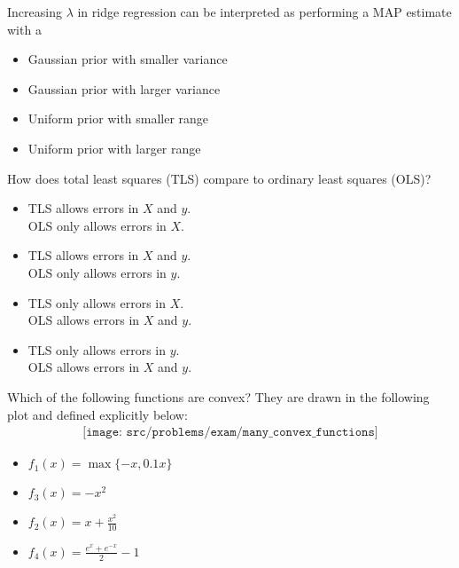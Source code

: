 \begin{Parts}

\Part Increasing $\lambda$ in ridge regression can be interpreted as performing a MAP estimate with a
\begin{multicols}{2}
	\begin{itemize}[label= ,itemsep=10pt, topsep=10pt, leftmargin=0pt]
		\item \mcqb Gaussian prior with smaller variance
		\item \mcqb Gaussian prior with larger variance
		\item \mcqb Uniform prior with smaller range
		\item \mcqb Uniform prior with larger range
	\end{itemize}
\end{multicols}

\Part How does total least squares (TLS) compare to ordinary least squares (OLS)?
\begin{multicols}{2}
	\begin{itemize}[label= ,itemsep=10pt, topsep=10pt, leftmargin=0pt]
		\item \mcqb TLS allows errors in $X$ and $y$. \\ OLS only allows errors in $X$.
		\item \mcqb TLS allows errors in $X$ and $y$. \\ OLS only allows errors in $y$. 
		\item \mcqb TLS only allows errors in $X$. \\ OLS allows errors in $X$ and $y$. 
		\item \mcqb TLS only allows errors in $y$. \\ OLS allows errors in $X$ and $y$. 
	\end{itemize}
\end{multicols}

\Part Which of the following functions are convex? They are drawn in the following plot and defined explicitly below:
\begin{align*}
\texttt{[image: src/problems/exam/many\_convex\_functions]}
\end{align*}
\begin{multicols}{2}
	\begin{itemize}[label= ,itemsep=10pt, topsep=10pt, leftmargin=0pt]
		\item \mcqb $f_1(x) = \max{\{-x,0.1x\}}$
		\item \mcqb $f_3(x) = -x^2$
		\item \mcqb $f_2(x) = x + \frac{x^2}{10}$
		\item \mcqb $f_4(x) = \frac{e^x + e^{-x}}{2} - 1$
	\end{itemize}
\end{multicols}


\end{Parts}
